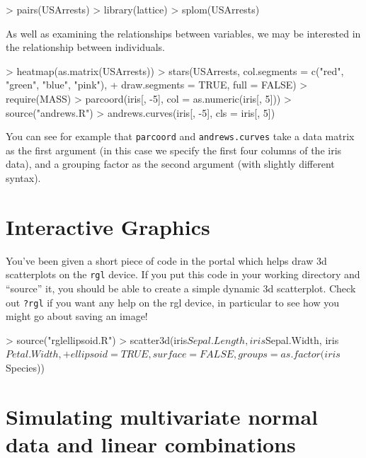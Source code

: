 \documentclass[11pt]{article}
\begin{document}
\begin{Schunk}
\begin{Sinput}
> pairs(USArrests)
> library(lattice)
> splom(USArrests)
\end{Sinput}
\end{Schunk}


As well as examining the relationships between variables, we may be interested in the relationship between individuals.

\begin{Schunk}
\begin{Sinput}
> heatmap(as.matrix(USArrests))
> stars(USArrests, col.segments = c("red", "green", "blue", "pink"), 
+     draw.segments = TRUE, full = FALSE)
> require(MASS)
> parcoord(iris[, -5], col = as.numeric(iris[, 5]))
> source("andrews.R")
> andrews.curves(iris[, -5], cls = iris[, 5])
\end{Sinput}
\end{Schunk}

You can see for example that \texttt{parcoord} and \texttt{andrews.curves} take a data matrix as the first argument (in this case we specify the first four columns of the iris data), and a grouping factor as the second argument (with slightly different syntax).


\section{Interactive Graphics}

You've been given a short piece of code in the portal which helps draw 3d scatterplots on the \texttt{rgl} device.   If you put this code in your working directory and ``source'' it, you should be able to create a simple dynamic 3d scatterplot.   Check out \texttt{?rgl} if you want any help on the rgl device, in particular to see how you might go about saving an image!

\begin{Schunk}
\begin{Sinput}
> source("rglellipsoid.R")
> scatter3d(iris$Sepal.Length, iris$Sepal.Width, iris$Petal.Width, 
+     ellipsoid = TRUE, surface = FALSE, groups = as.factor(iris$Species))
\end{Sinput}
\end{Schunk}


\section{Simulating multivariate normal data and linear combinations}
\end{document}

